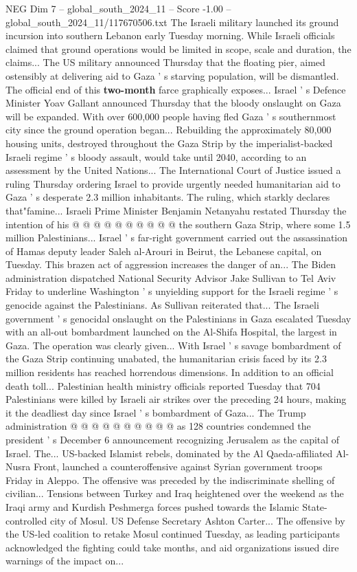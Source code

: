 \begin{textsample}{NEG Dim 7 – global\_south\_2024\_11 – Score -1.00 – global\_south\_2024\_11/117670506.txt}  \label{ex:f7_neg_314}
The Israeli military launched its ground incursion into southern Lebanon early Tuesday morning.
While Israeli officials claimed that ground operations would be limited in scope, scale and duration, the claims...
The US military announced Thursday that the floating pier, aimed ostensibly at delivering aid to Gaza ' s starving population, will be dismantled.
The official end of this \textbf{two-month} farce graphically exposes...
Israel ' s Defence Minister Yoav Gallant announced Thursday that the bloody onslaught on Gaza will be expanded.
With over 600,000 people having fled Gaza ' s southernmost city since the ground operation began...
Rebuilding the approximately 80,000 housing units, destroyed throughout the Gaza Strip by the imperialist-backed Israeli regime ' s bloody assault, would take until 2040, according to an assessment by the United Nations...
The International Court of Justice issued a ruling Thursday ordering Israel to provide urgently needed humanitarian aid to Gaza ' s desperate 2.3 million inhabitants.
The ruling, which starkly declares that"famine...
Israeli Prime Minister Benjamin Netanyahu restated Thursday the intention of his @ @ @ @ @ @ @ @ @ @ the southern Gaza Strip, where some 1.5 million Palestinians...
Israel ' s far-right government carried out the assassination of Hamas deputy leader Saleh al-Arouri in Beirut, the Lebanese capital, on Tuesday.
This brazen act of aggression increases the danger of an...
The Biden administration dispatched National Security Advisor Jake Sullivan to Tel Aviv Friday to underline Washington ' s unyielding support for the Israeli regime ' s genocide against the Palestinians.
As Sullivan reiterated that...
The Israeli government ' s genocidal onslaught on the Palestinians in Gaza escalated Tuesday with an all-out bombardment launched on the Al-Shifa Hospital, the largest in Gaza.
The operation was clearly given...
With Israel ' s savage bombardment of the Gaza Strip continuing unabated, the humanitarian crisis faced by its 2.3 million residents has reached horrendous dimensions.
In addition to an official death toll...
Palestinian health ministry officials reported Tuesday that 704 Palestinians were killed by Israeli air strikes over the preceding 24 hours, making it the deadliest day since Israel ' s bombardment of Gaza...
The Trump administration @ @ @ @ @ @ @ @ @ @ as 128 countries condemned the president ' s December 6 announcement recognizing Jerusalem as the capital of Israel.
The...
US-backed Islamist rebels, dominated by the Al Qaeda-affiliated Al-Nusra Front, launched a counteroffensive against Syrian government troops Friday in Aleppo.
The offensive was preceded by the indiscriminate shelling of civilian...
Tensions between Turkey and Iraq heightened over the weekend as the Iraqi army and Kurdish Peshmerga forces pushed towards the Islamic State-controlled city of Mosul.
US Defense Secretary Ashton Carter...
The offensive by the US-led coalition to retake Mosul continued Tuesday, as leading participants acknowledged the fighting could take months, and aid organizations issued dire warnings of the impact on...

\end{textsample}

